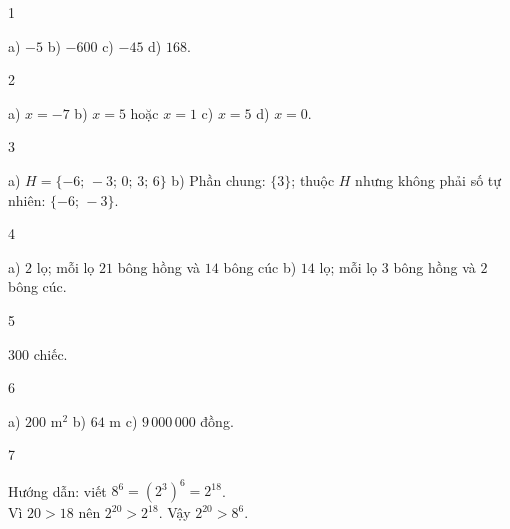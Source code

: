 \begin{Solbook}{1}
 \par \noindent a) $-5$ \hfill b) $-600$ \hfill c) $-45$ \hfill d) $168$. \hfill \qedEX 
\end{Solbook}
\begin{Solbook}{2}
 \par \noindent a) $x=-7$ \hfill b) $x=5$ hoặc $x=1$ \hfill c) $x=5$ \hfill d) $x=0$. \hfill \qedEX 
\end{Solbook}
\begin{Solbook}{3}
 \par \noindent a) $H=\{-6;\,-3;\,0;\,3;\,6\}$ \hfill b) Phần chung: $\{3\}$; thuộc $H$ nhưng không phải số tự nhiên: $\{-6;\,-3\}$. \hfill \qedEX 
\end{Solbook}
\begin{Solbook}{4}
 \par \noindent a) $2$ lọ; mỗi lọ $21$ bông hồng và $14$ bông cúc \hfill b) $14$ lọ; mỗi lọ $3$ bông hồng và $2$ bông cúc. \hfill \qedEX 
\end{Solbook}
\begin{Solbook}{5}
 \par \noindent $300$ chiếc. \hfill \qedEX 
\end{Solbook}
\begin{Solbook}{6}
 \par \noindent a) $200$ m$^{2}$ \hfill b) $64$ m \hfill c) $9\,000\,000$ đồng. \hfill \qedEX 
\end{Solbook}
\begin{Solbook}{7}
 \par \noindent Hướng dẫn: viết $8^{6}=(2^{3})^{6}=2^{18}$.\\ Vì $20>18$ nên $2^{20}>2^{18}$. Vậy $2^{20}>8^{6}$. \hfill \qedEX 
\end{Solbook}
